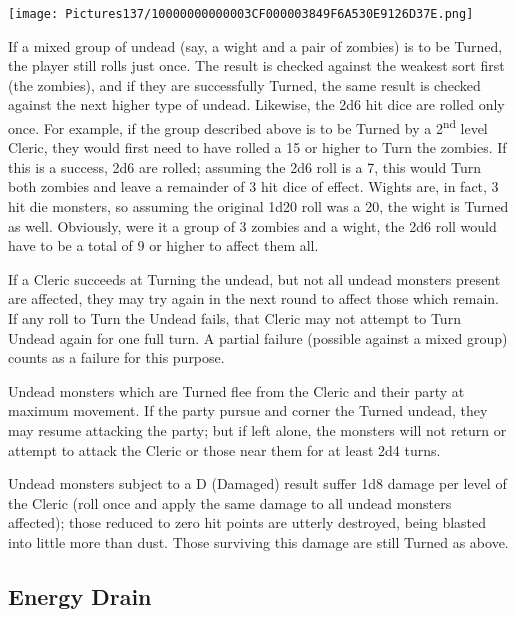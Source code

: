 \documentclass[a4paper,twoside,openany,10pt]{book}
\begin{document}
\begin{multicols}{2}
	

\begin{flushleft}
	\texttt{[image: Pictures137/10000000000003CF000003849F6A530E9126D37E.png]}
\end{flushleft}

If a mixed group of undead (say, a wight and a pair of zombies) is to be Turned, the player still rolls just once. The result is checked against the weakest sort first (the zombies), and if they are successfully Turned, the same result is checked against the next higher type of undead. Likewise, the 2d6 hit dice are rolled only once. For example, if the group described above is to be Turned by a 2\textsuperscript{nd} level Cleric, they would first need to have rolled a 15 or higher to Turn the zombies. If this is a success, 2d6 are rolled; assuming the 2d6 roll is a 7, this would Turn both zombies and leave a remainder of 3 hit dice of effect. Wights are, in fact, 3 hit die monsters, so assuming the original 1d20 roll was a 20, the wight is Turned as well. Obviously, were it a group of 3 zombies and a wight, the 2d6 roll would have to be a total of 9 or higher to affect them all.

If a Cleric succeeds at Turning the undead, but not all undead monsters present are affected, they may try again in the next round to affect those which remain. If any roll to Turn the Undead fails, that Cleric may not attempt to Turn Undead again for one full turn. A partial failure (possible against a mixed group) counts as a failure for this purpose.

Undead monsters which are Turned flee from the Cleric and their party at maximum movement. If the party pursue and corner the Turned undead, they may resume attacking the party; but if left alone, the monsters will not return or attempt to attack the Cleric or those near them for at least 2d4 turns.

Undead monsters subject to a D (Damaged) result suffer 1d8 damage per level of the Cleric (roll once and apply the same damage to all undead monsters affected); those reduced to zero hit points are utterly destroyed, being blasted into little more than dust. Those surviving this damage are still Turned as above.

\subsection{Energy Drain}\label{energy-drain}


\end{multicols}
\end{document}
